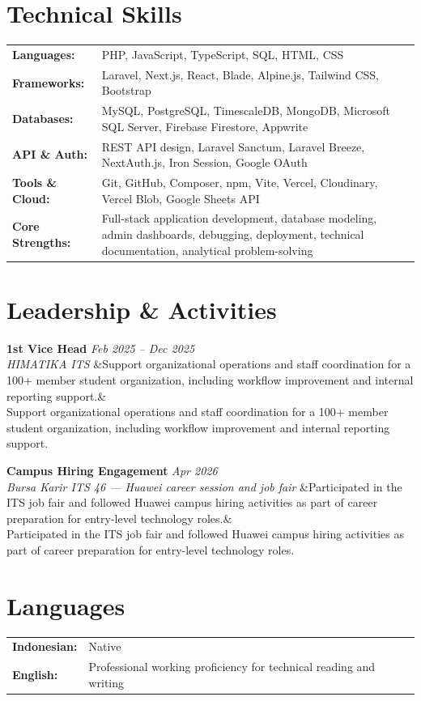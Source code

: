 \documentclass[a4paper,11pt]{article}
\newcommand{\cventry}[4]{%
  \noindent\textbf{#1} \hfill \textit{#3} \\
  \textit{#2}
  \ifx&#4& \else \\ \small #4 \fi
  \vspace{6pt}
}
\begin{document}
\section{Technical Skills}
\begin{tabularx}{\textwidth}{@{}l X@{}}
\textbf{Languages:} & PHP, JavaScript, TypeScript, SQL, HTML, CSS \\[3pt]
\textbf{Frameworks:} & Laravel, Next.js, React, Blade, Alpine.js, Tailwind CSS, Bootstrap \\[3pt]
\textbf{Databases:} & MySQL, PostgreSQL, TimescaleDB, MongoDB, Microsoft SQL Server, Firebase Firestore, Appwrite \\[3pt]
\textbf{API \& Auth:} & REST API design, Laravel Sanctum, Laravel Breeze, NextAuth.js, Iron Session, Google OAuth \\[3pt]
\textbf{Tools \& Cloud:} & Git, GitHub, Composer, npm, Vite, Vercel, Cloudinary, Vercel Blob, Google Sheets API \\[3pt]
\textbf{Core Strengths:} & Full-stack application development, database modeling, admin dashboards, debugging, deployment, technical documentation, analytical problem-solving \\
\end{tabularx}

\section{Leadership \& Activities}
\cventry
  {1st Vice Head}
  {HIMATIKA ITS}
  {Feb 2025 -- Dec 2025}
  {Support organizational operations and staff coordination for a 100+ member student organization, including workflow improvement and internal reporting support.}

\cventry
  {Campus Hiring Engagement}
  {Bursa Karir ITS 46 --- Huawei career session and job fair}
  {Apr 2026}
  {Participated in the ITS job fair and followed Huawei campus hiring activities as part of career preparation for entry-level technology roles.}

\section{Languages}
\begin{tabularx}{\textwidth}{@{}l l@{}}
\textbf{Indonesian:} & Native \\
\textbf{English:} & Professional working proficiency for technical reading and writing \\
\end{tabularx}
\end{document}
